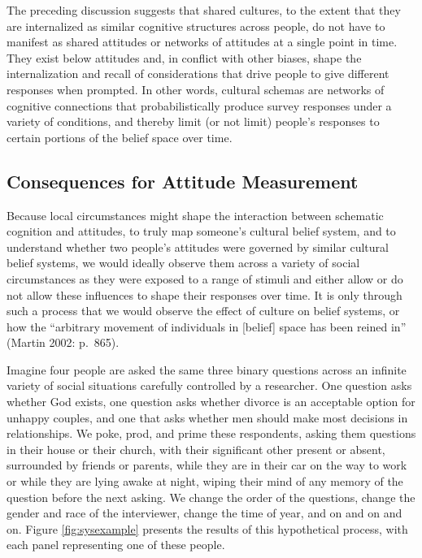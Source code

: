 \documentclass[12pt,]{article}
\begin{document}
The preceding discussion suggests that shared cultures, to the extent that they are internalized as similar cognitive structures across people, do not have to manifest as shared attitudes or networks of attitudes at a single point in time. They exist below attitudes and, in conflict with other biases, shape the internalization and recall of considerations that drive people to give different responses when prompted. In other words, cultural schemas are networks of cognitive connections that probabilistically produce survey responses under a variety of conditions, and thereby limit (or not limit) people's responses to certain portions of the belief space over time.

\hypertarget{consequences-for-attitude-measurement}{%
\subsection{Consequences for Attitude Measurement}\label{consequences-for-attitude-measurement}}

Because local circumstances might shape the interaction between schematic cognition and attitudes, to truly map someone's cultural belief system, and to understand whether two people's attitudes were governed by similar cultural belief systems, we would ideally observe them across a variety of social circumstances as they were exposed to a range of stimuli and either allow or do not allow these influences to shape their responses over time. It is only through such a process that we would observe the effect of culture on belief systems, or how the ``arbitrary movement of individuals in {[}belief{]} space has been reined in'' (Martin 2002: p.~865).

Imagine four people are asked the same three binary questions across an infinite variety of social situations carefully controlled by a researcher. One question asks whether God exists, one question asks whether divorce is an acceptable option for unhappy couples, and one that asks whether men should make most decisions in relationships. We poke, prod, and prime these respondents, asking them questions in their house or their church, with their significant other present or absent, surrounded by friends or parents, while they are in their car on the way to work or while they are lying awake at night, wiping their mind of any memory of the question before the next asking. We change the order of the questions, change the gender and race of the interviewer, change the time of year, and on and on and on. Figure \ref{fig:sysexample} presents the results of this hypothetical process, with each panel representing one of these people.
\end{document}
